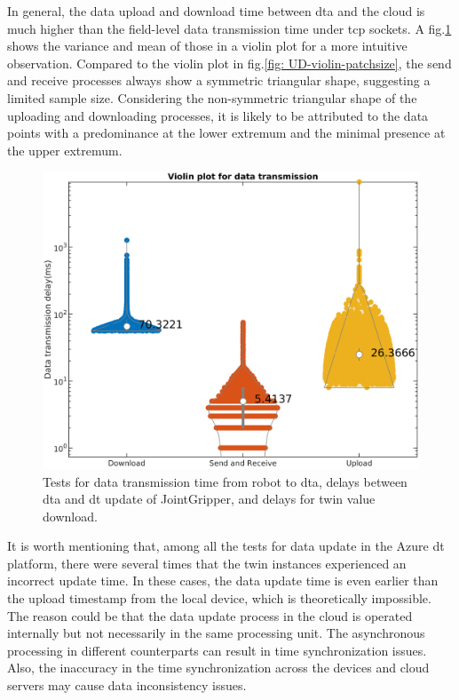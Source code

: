 In general, the data upload and download time between \gls{dta} and the cloud is 
much higher than the field-level data transmission time under \gls{tcp} sockets. 
A fig.\ref{fig: SR-U-D-violin} shows the variance and mean of those in a violin plot 
for a more intuitive observation. 
Compared to the violin plot in fig.\ref{fig: UD-violin-patchsize}, the send and receive 
processes always show a symmetric triangular shape, suggesting a limited sample size. 
Considering the non-symmetric triangular shape of the uploading and downloading processes, 
it is likely to be attributed to the data points with a predominance at the lower extremum 
and the minimal presence at the upper extremum.
\begin{figure}[htb]
    \centering
    \includegraphics[width=\textwidth]{figures/tests/DT/log_violin_Plot_3cat.png}
    \caption{Tests for data transmission time from robot to \gls{dta}, 
    delays between \gls{dta} and \gls{dt} 
    update of JointGripper, and delays for twin value download.\label{fig: SR-U-D-violin}} 
\end{figure}


It is worth mentioning that, among all the tests for data update 
in the Azure \gls{dt} platform, there were several times that the 
twin instances experienced an incorrect update time. In these cases, 
the data update time is even earlier than the upload timestamp from the 
local device, which is theoretically impossible. The reason could be 
that the data update process in the cloud is operated internally but not necessarily in 
the same processing unit. The asynchronous processing in different counterparts 
can result in time synchronization issues. Also, the inaccuracy in the 
time synchronization across the devices and cloud servers may cause data 
inconsistency issues.



